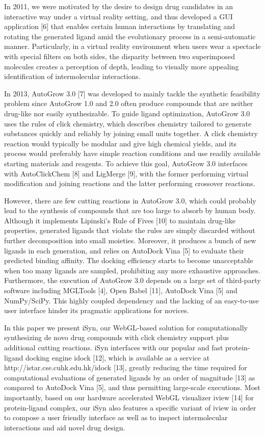 In 2011, we were motivated by the desire to design drug candidates in an interactive way under a virtual reality setting, and thus developed a GUI application [6] that enables certain human interactions by translating and rotating the generated ligand amid the evolutionary process in a semi-automatic manner. Particularly, in a virtual reality environment when users wear a spectacle with special filters on both sides, the disparity between two superimposed molecules creates a perception of depth, leading to visually more appealing identification of intermolecular interactions.

In 2013, AutoGrow 3.0 [7] was developed to mainly tackle the synthetic feasibility problem since AutoGrow 1.0 and 2.0 often produce compounds that are neither drug-like nor easily synthesizable. To guide ligand optimization, AutoGrow 3.0 uses the rules of click chemistry, which describes chemistry tailored to generate substances quickly and reliably by joining small units together. A click chemistry reaction would typically be modular and give high chemical yields, and its process would preferably have simple reaction conditions and use readily available starting materials and reagents. To achieve this goal, AutoGrow 3.0 interfaces with AutoClickChem [8] and LigMerge [9], with the former performing virtual modification and joining reactions and the latter performing crossover reactions.

However, there are few cutting reactions in AutoGrow 3.0, which could probably lead to the synthesis of compounds that are too large to absorb by human body. Although it implements Lipinski's Rule of Fives [10] to maintain drug-like properties, generated ligands that violate the rules are simply discarded without further decomposition into small moieties. Moreover, it produces a bunch of new ligands in each generation, and relies on AutoDock Vina [5] to evaluate their predicted binding affinity. The docking efficiency starts to become unacceptable when too many ligands are sampled, prohibiting any more exhaustive approaches. Furthermore, the execution of AutoGrow 3.0 depends on a large set of third-party software including MGLTools [4], Open Babel [11], AutoDock Vina [5] and NumPy/SciPy. This highly coupled dependency and the lacking of an easy-to-use user interface hinder its pragmatic applications for novices.

In this paper we present iSyn, our WebGL-based solution for computationally synthesizing de novo drug compounds with click chemistry support plus additional cutting reactions. iSyn interfaces with our popular and fast protein-ligand docking engine idock [12], which is available as a service at http://istar.cse.cuhk.edu.hk/idock [13], greatly reducing the time required for computational evaluations of generated ligands by an order of magnitude [13] as compared to AutoDock Vina [5], and thus permitting large-scale executions. Most importantly, based on our hardware accelerated WebGL visualizer iview [14] for protein-ligand complex, our iSyn also features a specific variant of iview in order to compose a user friendly interface as well as to inspect intermolecular interactions and aid novel drug design.

